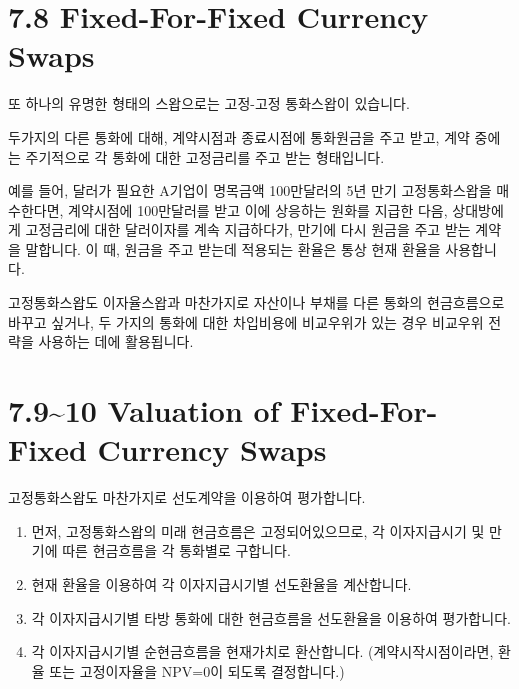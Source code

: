 \documentclass[
  letterpaper,
  DIV=11,
  numbers=noendperiod]{scrreprt}
\begin{document}
\section*{7.8 Fixed-For-Fixed Currency
Swaps}\label{fixed-for-fixed-currency-swaps}


또 하나의 유명한 형태의 스왑으로는 고정-고정 통화스왑이 있습니다.

두가지의 다른 통화에 대해, 계약시점과 종료시점에 통화원금을 주고 받고,
계약 중에는 주기적으로 각 통화에 대한 고정금리를 주고 받는 형태입니다.

예를 들어, 달러가 필요한 A기업이 명목금액 100만달러의 5년 만기
고정통화스왑을 매수한다면, 계약시점에 100만달러를 받고 이에 상응하는
원화를 지급한 다음, 상대방에게 고정금리에 대한 달러이자를 계속
지급하다가, 만기에 다시 원금을 주고 받는 계약을 말합니다. 이 때, 원금을
주고 받는데 적용되는 환율은 통상 현재 환율을 사용합니다.

고정통화스왑도 이자율스왑과 마찬가지로 자산이나 부채를 다른 통화의
현금흐름으로 바꾸고 싶거나, 두 가지의 통화에 대한 차입비용에 비교우위가
있는 경우 비교우위 전략을 사용하는 데에 활용됩니다.

\section*{7.9\textasciitilde10 Valuation of Fixed-For-Fixed Currency
Swaps}\label{valuation-of-fixed-for-fixed-currency-swaps}


고정통화스왑도 마찬가지로 선도계약을 이용하여 평가합니다.

\begin{enumerate}
\def\labelenumi{(\arabic{enumi})}
\item
  먼저, 고정통화스왑의 미래 현금흐름은 고정되어있으므로, 각 이자지급시기
  및 만기에 따른 현금흐름을 각 통화별로 구합니다.
\item
  현재 환율을 이용하여 각 이자지급시기별 선도환율을 계산합니다.
\item
  각 이자지급시기별 타방 통화에 대한 현금흐름을 선도환율을 이용하여
  평가합니다.
\item
  각 이자지급시기별 순현금흐름을 현재가치로 환산합니다.
  (계약시작시점이라면, 환율 또는 고정이자율을 NPV=0이 되도록
  결정합니다.)
\end{enumerate}
\end{document}
